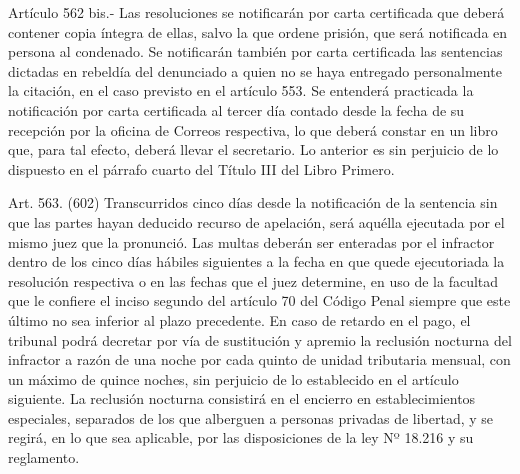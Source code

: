     Artículo 562 bis.- Las resoluciones se notificarán por carta certificada que deberá contener copia íntegra de ellas, salvo la que ordene prisión, que será notificada en persona al condenado.
    Se notificarán también por carta certificada las sentencias dictadas en rebeldía del denunciado a quien no se haya entregado personalmente la citación, en el caso previsto en el artículo 553.
    Se entenderá practicada la notificación por carta certificada al tercer día contado desde la fecha de su recepción por la oficina de Correos respectiva, lo que deberá constar en un libro que, para tal efecto, deberá llevar el secretario. Lo anterior es sin perjuicio de lo dispuesto en el párrafo cuarto del Título III del Libro Primero.

    Art. 563. (602) Transcurridos cinco días desde la notificación de la sentencia sin que las partes hayan deducido recurso de apelación, será aquélla ejecutada por el mismo juez que la pronunció.
    Las multas deberán ser enteradas por el infractor dentro de los cinco días hábiles siguientes a la fecha en que quede ejecutoriada la resolución respectiva o en las fechas que el juez determine, en uso de la facultad que le confiere el inciso segundo del artículo 70 del Código Penal siempre que este último no sea inferior al plazo precedente. En caso de retardo en el pago, el tribunal podrá decretar por vía de sustitución y apremio la reclusión nocturna del infractor a razón de una noche por cada quinto de unidad tributaria mensual, con un máximo de quince noches, sin perjuicio de lo establecido en el artículo siguiente. La reclusión nocturna consistirá en el encierro en establecimientos especiales, separados de los que alberguen a personas privadas de libertad, y se regirá, en lo que sea aplicable, por las disposiciones  de la ley Nº 18.216 y su reglamento.


